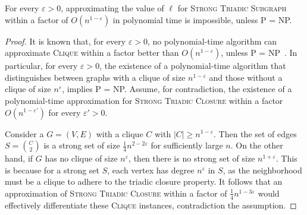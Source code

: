 \begin{lemma}
  For every $\varepsilon > 0$, approximating the value of $\ell$ for \textsc{Strong Triadic Subgraph} within a factor of $O(n^{1-\varepsilon})$ in polynomial time is impossible, unless P = NP.
\end{lemma}
\begin{proof}
  It is known that, for every $\varepsilon > 0$, no polynomial-time algorithm can approximate \textsc{Clique}
   within a factor better than $O(n^{1-\varepsilon})$, unless P = NP~\cite{Zuckerman07}.
   In particular, for
  every $\varepsilon > 0$, the existence of a polynomial-time algorithm that distinguishes between graphs
  with a clique of size $n^{1-\varepsilon}$ and those without 
  a clique of size $n^{\varepsilon}$, implies P = NP.
  Assume, for contradiction, the existence of a polynomial-time approximation for \textsc{Strong Triadic Closure} within a factor $O(n^{1-\varepsilon'})$ for every $\varepsilon' > 0$.
  
  Consider a $G=(V,E)$ with a clique $C$ with $|C| \geq n^{1-\varepsilon}$. 
  Then the set of edges $S=\binom{C}{2}$ is a strong set of size $\frac{1}{4} n^{2-2\varepsilon}$ for sufficiently large $n$.
  On the other hand, if $G$ has no clique of size $n^{\varepsilon}$, then there is no strong set of size $n^{1+\varepsilon}$.
  This is because for a strong set $S$, each vertex has degree $n^{\varepsilon}$ in $S$, as the neighborhood must be a clique to adhere to the triadic closure property.
  It follows that an approximation of \textsc{Strong Triadic Closure} within a factor of $\frac{1}{4}n^{1-3\varepsilon}$ would effectively differentiate these \textsc{Clique} instances, contradiction the assumption.
\end{proof}
